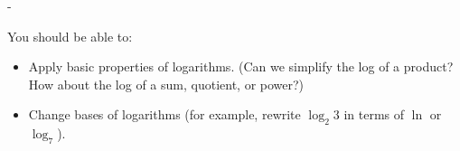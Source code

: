 \documentclass{article}
\makeatletter
\newlength{\tipmargin}
\renewenvironment{framed}{
  \setlength{\tipmargin}{\textwidth-\linewidth}
  \advance\@totalleftmargin-\tipmargin
  \def\FrameCommand{\hspace{\tipmargin}\fbox}%
  \advance\linewidth\tipmargin
  \MakeFramed {\advance\hsize-\width \FrameRestore}%
}
{\endMakeFramed}
\makeatother
\begin{document}

\begin{problemonly}
  \begin{framed}

You should be able to:
    \begin{itemize}[topsep=0pt,partopsep=0pt,parsep=8pt,itemsep=0pt]

    \item Apply basic properties of logarithms. (Can we simplify the log of a product? How about the log of a sum, quotient, or power?) 

    \item Change bases of logarithms (for example, rewrite $\log_2 3$ in terms of $\ln$ or $\log_7$). 

    \end{itemize}
  \end{framed}
\end{problemonly}
\end{document}
